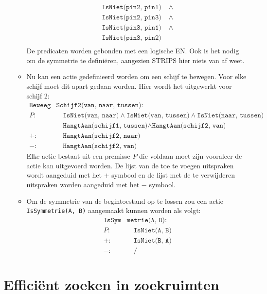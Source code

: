 \begin{itemize}
\begin{itemize}
\begin{equation*}
\begin{split}
				\texttt{IsNiet(pin2, pin1)}& \;\wedge \\
				\texttt{IsNiet(pin2, pin3)}& \;\wedge \\
				\texttt{IsNiet(pin3, pin1)}& \;\wedge \\
				\texttt{IsNiet(pin3, pin2)}&  \\
			\end{split}
		\end{equation*}
		De predicaten worden gebonden met een logische EN. Ook is het nodig om de symmetrie te definiëren, aangezien STRIPS hier niets van af weet.
		\item Nu kan een actie gedefinieerd worden om een schijf te bewegen. Voor elke schijf moet dit apart gedaan worden. Hier wordt het uitgewerkt voor schijf 2:
		\begin{equation*}
			\begin{split}
				\texttt{Beweeg}&\texttt{Schijf2(van, naar, tussen)}: \\ 
				P : &\quad\texttt{IsNiet(van, naar)} \wedge \texttt{IsNiet(van, tussen)} \wedge \texttt{IsNiet(naar, tussen)}  \\
				    &\quad \texttt{HangtAan(schijf1, tussen)} \wedge \texttt{HangtAan(schijf2, van)} \\
				+ : &\quad \texttt{HangtAan(schijf2, naar)}\\
				- : &\quad \texttt{HangtAan(schijf2, van)}
			\end{split}
		\end{equation*}
		Elke actie bestaat uit een premisse $P$ die voldaan moet zijn vooraleer de actie kan uitgevoerd worden. De lijst van de toe te voegen uitspraken wordt aangeduid met het $+$ symbool en de lijst met de te verwijderen uitspraken worden aangeduid met het $-$ symbool.
		\item Om de symmetrie van de begintoestand op te lossen zou een actie \texttt{IsSymmetrie(A, B)} aangemaakt kunnen worden als volgt:
		\begin{equation*}
			\begin{split}
				\texttt{IsSym}&\texttt{metrie(A, B)}: \\ 
				P : &\quad \texttt{IsNiet(A, B)}\\
				+ : &\quad \texttt{IsNiet(B, A)}\\
				- : &\quad /
			\end{split}
		\end{equation*}
	\end{itemize}
\end{itemize}
\section{Efficiënt zoeken in zoekruimten}
